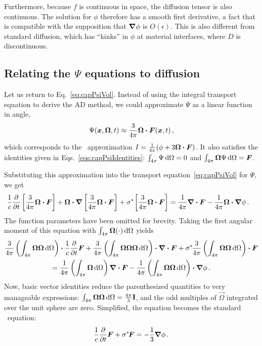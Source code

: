 Furthermore, because $f$ is continuous in space, the diffusion tensor is also
continuous. The solution for $\phi$ therefore has a smooth first
derivative, a fact that is compatible with the supposition that $\bm{\nabla} \phi$
is $O(\epsilon)$. This is also different from standard diffusion, which has
``kinks'' in $\phi$ at material interfaces, where $D$ is discontinuous.

\subsection{Relating the \texorpdfstring{$\Psi$}{Psi} equations to
diffusion}\label{sec:adDiscDiff}
Let us return to Eq.~\eqref{eq:capPsiVol}. Instead of using the integral
transport equation to derive the AD method, we could approximate $\Psi$
as a linear function in angle,
\begin{equation*}
  \Psi(\bm{x}, \bm{\Omega}, t) \approx \frac{3}{4\pi} \bm{\Omega} \bm{\cdot}
  \bm{F}(\bm{x}, t)\,,
\end{equation*}
which corresponds to the \Pone\ approximation $I= \frac{1}{4\pi} (\phi +
3\bm{\Omega} \bm{\cdot} \bm{F})$. It also satisfies the identities given in
Eqs.~\eqref{eqs:capPsiIdentities}: $\int_{4\pi} \Psi \mathop{}\!\mathrm{d}\Omega = 0$ and
$\int_{4\pi} \bm{\Omega} \Psi \mathop{}\!\mathrm{d}\Omega = \bm{F}$.

Substituting this approximation into the transport equation~\eqref{eq:capPsiVol}
for $\Psi$, we get
\begin{align*}
  \frac{1}{c} \frac{\partial }{\partial t} \left[ \frac{3}{4\pi} \bm{\Omega} \bm{\cdot} \bm{F} \right]
  + \bm{\Omega}\bm{\cdot} \bm{\nabla} \left[ \frac{3}{4\pi} \bm{\Omega} \bm{\cdot} \bm{F} \right]
  + \sigma^{*\!} \left[ \frac{3}{4\pi} \bm{\Omega} \bm{\cdot} \bm{F} \right]
  &= \frac{1}{4\pi} \bm{\nabla} \bm{\cdot}\bm{F}
  - \frac{1}{4\pi} \bm{\Omega}\bm{\cdot} \bm{\nabla} \phi\,.
\end{align*}
The function parameters have been omitted for brevity.
Taking the first angular moment of this equation with $\int_{4\pi}
\bm{\Omega}(\cdot) \mathop{}\!\mathrm{d}\Omega$ yields
\begin{multline*}
\frac{3}{4\pi} \left( \int_{4\pi} \bm{\Omega}\bm{\Omega}\mathop{}\!\mathrm{d}\Omega \right) \bm{\cdot}
\frac{1}{c} \frac{\partial }{\partial t} \bm{F}
+ \frac{3}{4\pi} \left( \int_{4\pi}
  \bm{\Omega}\bm{\Omega}\bm{\Omega}\mathop{}\!\mathrm{d}\Omega \right)
\bm{\cdot} \bm{\nabla} \bm{\cdot} \bm{F}
+ \sigma^{*\!} \frac{3}{4\pi} \left( \int_{4\pi}
\bm{\Omega}\bm{\Omega}\mathop{}\!\mathrm{d}\Omega \right) \bm{\cdot}\bm{F}
\\
= \frac{1}{4\pi} \left( \int_{4\pi} \bm{\Omega}\mathop{}\!\mathrm{d}\Omega \right)
\bm{\nabla} \bm{\cdot}\bm{F}
- \frac{1}{4\pi} \left( \int_{4\pi} \bm{\Omega}\bm{\Omega}\mathop{}\!\mathrm{d}\Omega \right)
\bm{\cdot} \bm{\nabla} \phi\,.
\end{multline*}
Now, basic vector identities \cite{Lar2007} reduce the parenthesized
quantities to very manageable expressions: $\int_{4\pi}
\bm{\Omega}\bm{\Omega}\mathop{}\!\mathrm{d}\Omega=\frac{4\pi}{3}\mathbf{I}$, and the odd
multiples of $\vec{\Omega}$ integrated over the unit sphere are zero. Simplified,
the equation becomes the standard \Pone\ equation:
\begin{equation*}
  \frac{1}{c} \frac{\partial }{\partial t} \bm{F}
  + \sigma^{*\!} \bm{F}
  = - \frac{1}{3} \bm{\nabla} \phi\,.
\end{equation*}

